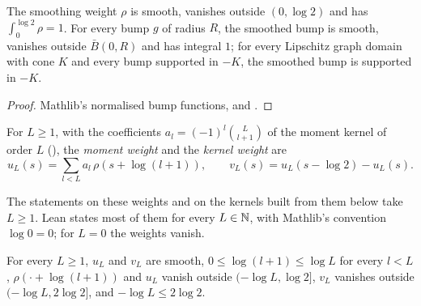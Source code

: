 \begin{lemma}
\label{lem:smoothed-bump}
\leanok
{}
The smoothing weight $\rho$ is smooth, vanishes outside $(0, \log 2)$ and has
$\int_0^{\log 2} \rho = 1$. For every bump $g$ of radius $R$, the smoothed bump is smooth,
vanishes outside $\bar B(0, R)$ and has integral $1$; for every Lipschitz graph domain with cone
$K$ and every bump supported in $-K$, the smoothed bump is supported in $-K$.
\end{lemma}

\begin{proof}
\leanok
Mathlib's normalised bump functions,  and
.
\end{proof}

\begin{definition}
\label{def:moment-weight}
\leanok
{}
For $L \geq 1$, with the coefficients $a_l = (-1)^l \binom{L}{l+1}$ of the moment kernel of order
$L$ (), the \emph{moment weight} and the \emph{kernel weight} are
\[
  u_L(s) = \sum_{l < L} a_l \, \rho(s + \log(l + 1)) , \qquad
  v_L(s) = u_L(s - \log 2) - u_L(s) .
\]
\end{definition}

The statements on these weights and on the kernels built from them below take $L \geq 1$. Lean
states most of them for every $L \in \mathbb{N}$, with Mathlib's convention $\log 0 = 0$; for $L = 0$ the
weights vanish.

\begin{lemma}
\label{lem:moment-weight-support}
\leanok
{}
For every $L \geq 1$, $u_L$ and $v_L$ are smooth, $0 \leq \log(l + 1) \leq \log L$ for every
$l < L$, $\rho(\cdot + \log(l + 1))$ and $u_L$ vanish outside $(-\log L, \log 2]$, $v_L$ vanishes
outside $(-\log L, 2 \log 2]$, and $-\log L \leq 2 \log 2$.
\end{lemma}

